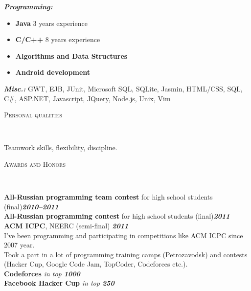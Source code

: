 \documentclass[12pt]{article}
\newenvironment{changemargin}[2]{%
  \begin{list}{}{%
    \setlength{\topsep}{0pt}%
    \setlength{\leftmargin}{#1}%
    \setlength{\rightmargin}{#2}%
    \setlength{\listparindent}{\parindent}%
    \setlength{\itemindent}{\parindent}%
    \setlength{\parsep}{\parskip}%
  }%
  \item[]}{\end{list}
}
\newcommand{\lineover}{
	\begin{changemargin}{-0.05in}{-0.05in}
		\vspace*{-8pt}
		\hrulefill \\
		\vspace*{-2pt}
	\end{changemargin}
}
\newcommand{\header}[1]{
	\begin{changemargin}{-0.5in}{-0.5in}
		\scshape{#1}\\
  	\lineover
	\end{changemargin}
}
\newenvironment{body} {
	\vspace*{-16pt}
	\begin{changemargin}{-0.25in}{-0.5in}
  }	
	{\end{changemargin}
}
\begin{document}
\begin{body}
	\vspace{14pt}
	\emph{\textbf{Programming:}}{}
	\begin{itemize}
		\item \textbf{Java} 3 years experience
		\item \textbf{C/C++} 8 years experience
		\item \textbf{Algorithms and Data Structures}
		\item \textbf{Android development} 
	\end{itemize}
	\emph{\textbf{Misc.:}}{} GWT, EJB, JUnit, Microsoft SQL, SQLite, Jasmin, HTML/CSS, SQL, C\#, ASP.NET, Javascript, JQuery, Node.js, Unix, Vim
\end{body}

\vspace{14pt}
\smallskip

\header{Personal qualities}

\begin{body}
	\vspace{14pt}
	Teamwork skills, flexibility, discipline.
\end{body}

\smallskip

\header{Awards and Honors}

\begin{body}
	\vspace{14pt}
	\textbf{All-Russian programming team contest} for high school students (final)\hfill \emph{\textbf{2010--2011}}\\
	\smallskip
	\textbf{All-Russian programming contest} for high school students (final)\hfill \emph{\textbf{2011}}\\
	\smallskip
	\textbf{ACM ICPC}, NEERC (semi-final) \hfill{} \emph{\textbf{2011}}\\
	\smallskip
	\vspace{14pt}
	I've been programming and participating in competitions like ACM ICPC since 2007 year. \\
	Took a part in a lot of programming training camps (Petrozavodsk) and contests (Hacker Cup, Google Code Jam, TopCoder, Codeforces etc.).\\
	\smallskip
	\textbf{Codeforces} \hfill{} \emph{in top \textbf{1000}}\\
	\smallskip
	\textbf{Facebook Hacker Cup} \hfill{} \emph{in top \textbf{250}}\\
	\smallskip
\end{body}
\end{document}
